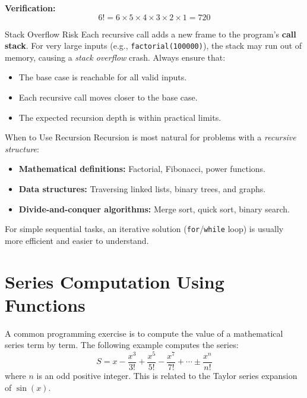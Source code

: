 \noindent\textbf{Verification:}
\[
    6! = 6 \times 5 \times 4 \times 3 \times 2 \times 1
       = \boxed{720}
\]

\begin{warningbox}{Stack Overflow Risk}
Each recursive call adds a new frame to the program's \textbf{call stack}.
For very large inputs (e.g., \texttt{factorial(100000)}), the stack may run
out of memory, causing a \emph{stack overflow} crash. Always ensure that:
\begin{itemize}
    \item The base case is reachable for all valid inputs.
    \item Each recursive call moves closer to the base case.
    \item The expected recursion depth is within practical limits.
\end{itemize}
\end{warningbox}

\begin{conceptbox}{When to Use Recursion}
Recursion is most natural for problems with a \emph{recursive structure}:
\begin{itemize}
    \item \textbf{Mathematical definitions:} Factorial, Fibonacci, power
          functions.
    \item \textbf{Data structures:} Traversing linked lists, binary trees,
          and graphs.
    \item \textbf{Divide-and-conquer algorithms:} Merge sort, quick sort,
          binary search.
\end{itemize}
For simple sequential tasks, an iterative solution (\texttt{for}/\texttt{while}
loop) is usually more efficient and easier to understand.
\end{conceptbox}

\section{Series Computation Using Functions}
\label{sec:series-computation}

A common programming exercise is to compute the value of a mathematical
series term by term. The following example computes the series:
\[
    S = x - \frac{x^{3}}{3!} + \frac{x^{5}}{5!}
      - \frac{x^{7}}{7!} + \cdots
      \pm \frac{x^{n}}{n!}
\]
where $n$ is an odd positive integer. This is related to the Taylor series
expansion of $\sin(x)$.

